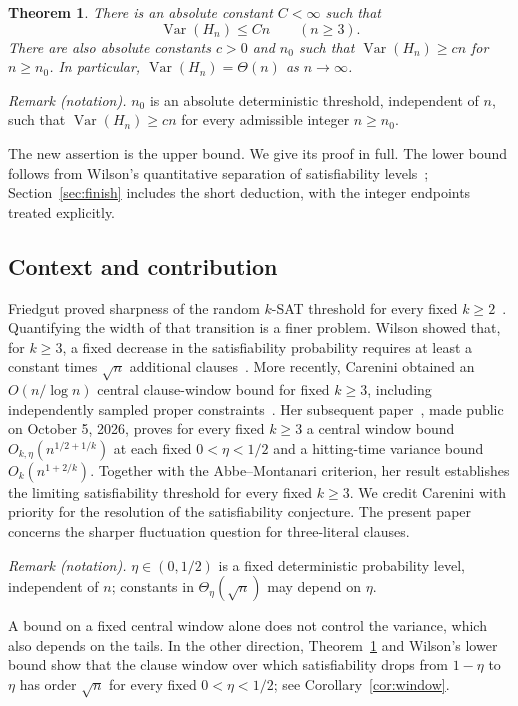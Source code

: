 \documentclass[11pt]{article}
\newtheorem{theorem}{Theorem}[section]
\theoremstyle{remark}
\newcommand{\Var}{\operatorname{Var}}
\numberwithin{equation}{section}
\begin{document}
\begin{theorem}
\label{thm:main}
There is an absolute constant $C<\infty$ such that
\[
 \Var(H_n)\le Cn\qquad(n\ge3).
\]
There are also absolute constants $c>0$ and $n_0$ such that
$\Var(H_n)\ge cn$ for $n\ge n_0$. In particular,
$\Var(H_n)=\Theta(n)$ as $n\to\infty$.
\end{theorem}

\noindent\textit{Remark (notation).} $n_0$ is an absolute deterministic threshold, independent of $n$, such that $\Var(H_n)\ge cn$ for every admissible integer $n\ge n_0$.


The new assertion is the upper bound. We give its proof in full.
The lower bound follows from Wilson's quantitative separation of
satisfiability levels~\cite[Corollary~4]{Wilson2002}; Section~\ref{sec:finish}
includes the short deduction, with the integer endpoints treated explicitly.

\subsection*{Context and contribution}

Friedgut proved sharpness of the random $k$-SAT threshold for every fixed
$k\ge2$~\cite[Theorem~1.3]{Friedgut1999}. Quantifying the width of that
transition is a finer problem. Wilson showed that, for $k\ge3$, a fixed
decrease in the satisfiability probability requires at least a constant
times $\sqrt n$ additional clauses~\cite{Wilson2002}. More recently,
Carenini obtained an $O(n/\log n)$ central clause-window bound for fixed
$k\ge3$, including independently sampled proper
constraints~\cite[Corollaries~7.10--7.11]{Carenini2026}.
Her subsequent paper~\cite[Theorems~1.1 and~1.3, Corollary~1.2]{Carenini2026Polynomial},
made public on October 5, 2026, proves for every fixed $k\ge3$ a central
window bound $O_{k,\eta}(n^{1/2+1/k})$ at each fixed $0<\eta<1/2$
and a hitting-time variance bound $O_k(n^{1+2/k})$.
Together with the Abbe--Montanari criterion, her result establishes the
limiting satisfiability threshold for every fixed $k\ge3$.
We credit Carenini with priority for the resolution of the satisfiability
conjecture. The present paper concerns the sharper fluctuation question
for three-literal clauses.

\noindent\textit{Remark (notation).} $\eta\in(0,1/2)$ is a fixed deterministic probability level, independent of $n$; constants in $\Theta_\eta(\sqrt n)$ may depend on $\eta$.


A bound on a fixed central window alone does not control the variance,
which also depends on the tails.
In the other direction, Theorem~\ref{thm:main} and Wilson's lower bound
show that the clause window over which satisfiability drops from
$1-\eta$ to $\eta$ has order $\sqrt n$ for every fixed $0<\eta<1/2$;
see Corollary~\ref{cor:window}.
\end{document}
